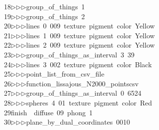 \begin{tabbing}
18\>$\triangleright$\>$\triangleright$\>$\triangleright$\>group\_of\_things\ 1\ \\[0pt]
19\>$\triangleright$\>$\triangleright$\>$\triangleright$\>group\_of\_things\ 2\ \\[0pt]
20\>$\triangleright$\>$\triangleright$\>$\triangleright$\>lines\ 0\ 009\ texture\ pigment\ color\ Yellow\ \ \ \\[0pt]
21\>$\triangleright$\>$\triangleright$\>$\triangleright$\>lines\ 1\ 009\ texture\ pigment\ color\ Yellow\ \ \ \\[0pt]
22\>$\triangleright$\>$\triangleright$\>$\triangleright$\>lines\ 2\ 009\ texture\ pigment\ color\ Yellow\ \ \ \\[0pt]
23\>$\triangleright$\>$\triangleright$\>$\triangleright$\>group\_of\_things\_as\_interval\ 3\ 39\ \\[0pt]
24\>$\triangleright$\>$\triangleright$\>$\triangleright$\>lines\ 3\ 002\ texture\ pigment\ color\ Black\ \ \ \\[0pt]
25\>$\triangleright$\>$\triangleright$\>$\triangleright$\>point\_list\_from\_csv\_file\ \\[0pt]
26\>$\triangleright$\>$\triangleright$\>$\triangleright$\>function\_lissajous\_N2000\_pointscsv\ \\[0pt]
27\>$\triangleright$\>$\triangleright$\>$\triangleright$\>group\_of\_things\_as\_interval\ 0\ 6524\\[0pt]
28\>$\triangleright$\>$\triangleright$\>$\triangleright$\>spheres\ 4\ 01\ texture\ pigment\ color\ Red\ \ \\[0pt]
29\>finish\ \ diffuse\ 09\ phong\ 1\ \\[0pt]
30\>$\triangleright$\>$\triangleright$\>$\triangleright$\>plane\_by\_dual\_coordinates\ 0010\ \\[0pt]

\end{tabbing}

